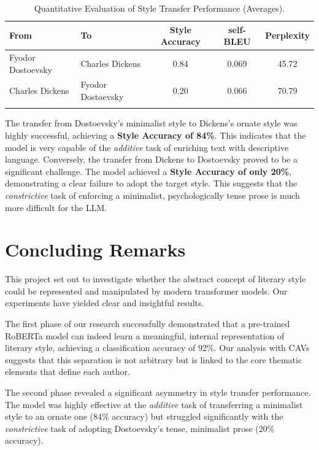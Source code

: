 \documentclass[sn-mathphys]{sn-jnl}%
\begin{document}
\begin{table}[h]
\begin{center}
\begin{minipage}{\textwidth}
\caption{Quantitative Evaluation of Style Transfer Performance (Averages).}\label{tab:style_transfer_results}
\begin{tabular*}{\textwidth}{@{\extracolsep{\fill}}llccc@{\extracolsep{\fill}}}
\toprule
From & To & Style Accuracy & self-BLEU & Perplexity \\
\midrule
Fyodor Dostoevsky & Charles Dickens & 0.84 & 0.069 & 45.72 \\
Charles Dickens   & Fyodor Dostoevsky & 0.20 & 0.066 & 70.79 \\
\botrule
\end{tabular*}
\end{minipage}
\end{center}
\end{table}

The transfer from Dostoevsky's minimalist style to Dickens's ornate style was highly successful, achieving a \textbf{Style Accuracy of 84\%}. This indicates that the model is very capable of the \textit{additive} task of enriching text with descriptive language. Conversely, the transfer from Dickens to Dostoevsky proved to be a significant challenge. The model achieved a \textbf{Style Accuracy of only 20\%}, demonstrating a clear failure to adopt the target style. This suggests that the \textit{constrictive} task of enforcing a minimalist, psychologically tense prose is much more difficult for the LLM.

\section{Concluding Remarks}\label{sec4}

This project set out to investigate whether the abstract concept of literary style could be represented and manipulated by modern transformer models. Our experiments have yielded clear and insightful results.

The first phase of our research successfully demonstrated that a pre-trained RoBERTa model can indeed learn a meaningful, internal representation of literary style, achieving a classification accuracy of 92\%. Our analysis with CAVs suggests that this separation is not arbitrary but is linked to the core thematic elements that define each author.

The second phase revealed a significant asymmetry in style transfer performance. The model was highly effective at the \textit{additive} task of transferring a minimalist style to an ornate one (84\% accuracy) but struggled significantly with the \textit{constrictive} task of adopting Dostoevsky's tense, minimalist prose (20\% accuracy).
\end{document}
